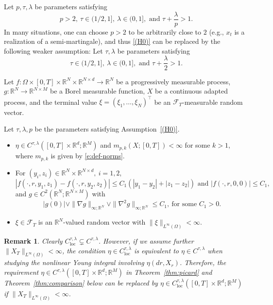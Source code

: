 \documentclass[11pt,reqno]{amsart}
\def\R{\mathbb R}
\newtheorem{remark}{Remark}[section]
\newenvironment{assumptionp}[1]{
\renewcommand\theassumptionalt{#1}
\assumptionalt
}{\endassumptionalt}
\numberwithin{equation}{section}
\begin{document}
\begin{assumptionp}{(H0)}\label{(H0)}
Let $p, \tau, \lambda$ be parameters satisfying  
\[p>2, \ \tau\in(1/2,1],\ \lambda\in(0,1], \text{ and }\tau+\frac{\lambda}{p}>1.\]
\end{assumptionp}
In many situations, one can choose $p>2$ to be arbitrarily close to $2$ (e.g., $x_t$ is a realization of a semi-martingale), and thus \ref{(H0)} can be replaced by the following weaker assumption:
\begin{assumptionp}{(H0')}\label{(H0')}
Let $\tau,\lambda$ be parameters satisfying  
\[\tau\in(1/2,1],\ \lambda\in(0,1], \text{ and }\tau+\frac{\lambda}{2}>1.\]
\end{assumptionp}

Let $f:\Omega\times[0,T]\times\mathbb{R}^{N}\times\mathbb{R}^{N\times d}\rightarrow\mathbb{R}^{N}$ be a progressively measurable process, $g:\mathbb{R}^{N}\rightarrow\mathbb{R}^{N\times M}$ be a Borel measurable function, $X$ be a continuous adapted process,  and the terminal value $\xi=(\xi_1, \dots, \xi_N)^{\top}$ be an $\mathcal{F}_{T}$-measurable random vector.  

\begin{assumptionp}{(H1)}\label{(H1)} Let $\tau,\lambda,p$ be the parameters satisfying Assumption~\ref{(H0)}.

\begin{itemize}
\item[$(1)$]  $\eta \in C^{\tau,\lambda}([0,T]\times\mathbb{R}^{d};\mathbb{R}^{M})$ and $m_{p,k}(X;[0,T])<\infty$ for some $k>1$, where $m_{p,k}$ is given by \eqref{e:def-norms}.  

\item[$(2)$]  For $(y_{i},z_{i})\in\mathbb{R}^{N}\times\mathbb{R}^{N\times d},\ i=1,2$,
\[|f(\cdot,r,y_{1},z_{1}) - f(\cdot, r,y_{2},z_{2})|\le C_{1}\left(|y_{1} - y_{2}| + |z_{1} - z_{2}|\right)		\text{ and } |f(\cdot,r,0,0)|\le C_{1},\]
and $g\in C^{2}(\mathbb{R}^{N};\mathbb{R}^{N\times M})$ with 
\[|g(0)|\vee\|\nabla g\|_{\infty;\mathbb{R}^{N}}\vee \|\nabla^2 g\|_{\infty;\mathbb{R}^{N}} \le C_{1}, \ \text{for some } C_{1}>0.
\]
 

\item[$(3)$]  $\xi\in \mathcal F_T$ is an $\mathbb{R}^{N}$-valued random vector  with $\|\xi\|_{L^{\infty}(\Omega)}<\infty$. 
\end{itemize}
\end{assumptionp}

\begin{remark}\label{rem:C}
Clearly $C^{\tau,\lambda}_{\mathrm{loc}}\subsetneq C^{\tau,\lambda}$. However, if we assume further $\|X_T\|_{L^{\infty}(\Omega)}<\infty$, the condition $\eta\in C^{\tau,\lambda}_{\mathrm{loc}}$ is equivalent to $\eta\in C^{\tau,\lambda}$ when studying the nonlinear Young integral involving $\eta(dr,X_r)$. Therefore, the requirement $\eta\in C^{\tau,\lambda}([0,T]\times\R^{d};\R^M)$ in Theorem~\ref{thm:picard} and Theorem~\ref{thm:comparison} below can be replaced by $\eta\in C^{\tau,\lambda}_{\mathrm{loc}}([0,T]\times\R^{d};\R^M)$ if $\|X_T\|_{L^{\infty}(\Omega)}<\infty$.
\end{remark}
\end{document}
